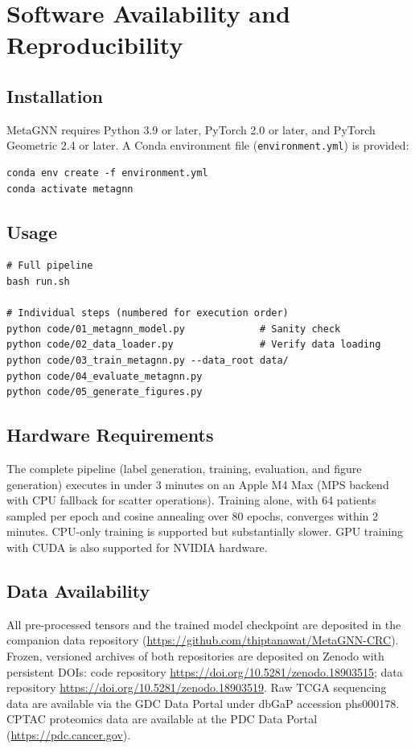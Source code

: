 \documentclass[12pt,a4paper]{article}
\begin{document}
\section{Software Availability and Reproducibility}

\subsection{Installation}

MetaGNN requires Python 3.9 or later, PyTorch 2.0 or later, and PyTorch Geometric 2.4 or later. A Conda environment file (\texttt{environment.yml}) is provided:

\begin{verbatim}
conda env create -f environment.yml
conda activate metagnn
\end{verbatim}

\subsection{Usage}

\begin{verbatim}
# Full pipeline
bash run.sh

# Individual steps (numbered for execution order)
python code/01_metagnn_model.py             # Sanity check
python code/02_data_loader.py               # Verify data loading
python code/03_train_metagnn.py --data_root data/
python code/04_evaluate_metagnn.py
python code/05_generate_figures.py
\end{verbatim}

\subsection{Hardware Requirements}

The complete pipeline (label generation, training, evaluation, and figure generation) executes in under 3 minutes on an Apple M4 Max (MPS backend with CPU fallback for scatter operations). Training alone, with 64 patients sampled per epoch and cosine annealing over 80 epochs, converges within 2 minutes. CPU-only training is supported but substantially slower. GPU training with CUDA is also supported for NVIDIA hardware.

\subsection{Data Availability}

All pre-processed tensors and the trained model checkpoint are deposited in the companion data repository (\url{https://github.com/thiptanawat/MetaGNN-CRC}). Frozen, versioned archives of both repositories are deposited on Zenodo with persistent DOIs: code repository \url{https://doi.org/10.5281/zenodo.18903515}; data repository \url{https://doi.org/10.5281/zenodo.18903519}. Raw TCGA sequencing data are available via the GDC Data Portal under dbGaP accession phs000178. CPTAC proteomics data are available at the PDC Data Portal (\url{https://pdc.cancer.gov}).
\end{document}
